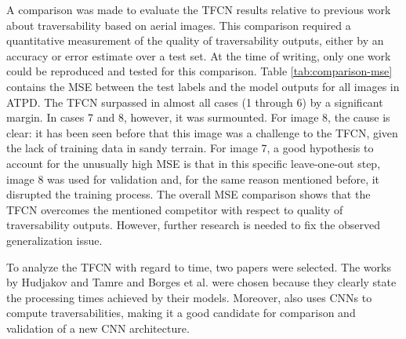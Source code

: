 \documentclass[conference]{IEEEtran}
\begin{document}
A comparison was made to evaluate the TFCN results relative to previous work about traversability based on aerial images.
This comparison required a quantitative measurement of the quality of traversability outputs, either by an accuracy or error estimate over a test set.
At the time of writing, only one work \cite{borges:2019} could be reproduced and tested for this comparison.
Table \ref{tab:comparison-mse} contains the MSE between the test labels and the model outputs for all images in ATPD.
The TFCN surpassed \cite{borges:2019} in almost all cases (1 through 6) by a significant margin.
In cases 7 and 8, however, it was surmounted.
For image 8, the cause is clear: it has been seen before that this image was a challenge to the TFCN, given the lack of training data in sandy terrain.
For image 7, a good hypothesis to account for the unusually high MSE is that in this specific leave-one-out step, image 8 was used for validation and, for the same reason mentioned before, it disrupted the training process.
The overall MSE comparison shows that the TFCN overcomes the mentioned competitor with respect to quality of traversability outputs.
However, further research is needed to fix the observed generalization issue.

To analyze the TFCN with regard to time, two papers were selected.
The works by Hudjakov and Tamre \cite{hudjakov:2013} and Borges et al. \cite{borges:2019} were chosen because they clearly state the processing times achieved by their models.
Moreover, \cite{hudjakov:2013} also uses CNNs to compute traversabilities, making it a good candidate for comparison and validation of a new CNN architecture.
\end{document}
